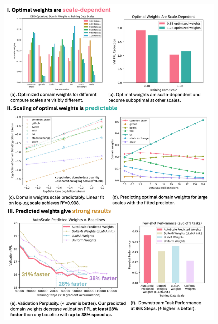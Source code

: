 \documentclass{article} %
\begin{document}

\begin{figure}[h!]
\begin{center}
\vspace{-2.1em}
\centering
  \includegraphics[width=.85\textwidth]{figs/agg4.png}
  \vspace{-0.5em}

\end{center}
\end{figure}
\end{document}
